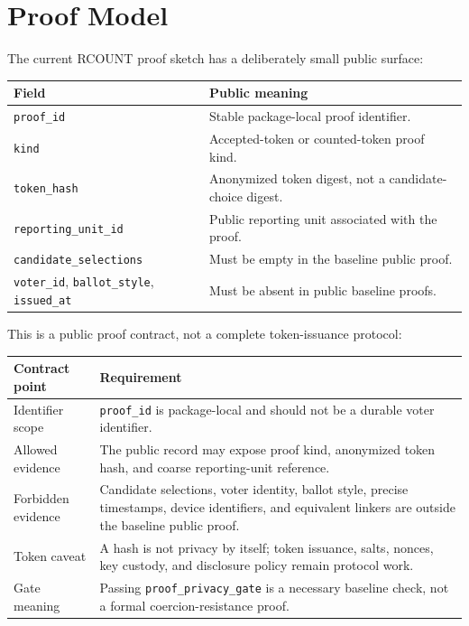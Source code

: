 \section{Proof Model}

The current RCOUNT proof sketch has a deliberately small public surface:

\begin{center}
\small
\begin{tabularx}{\textwidth}{lX}
\toprule
Field & Public meaning \\
\midrule
\texttt{proof\_id} & Stable package-local proof identifier. \\
\texttt{kind} & Accepted-token or counted-token proof kind. \\
\texttt{token\_hash} & Anonymized token digest, not a candidate-choice digest. \\
\texttt{reporting\_unit\_id} & Public reporting unit associated with the proof. \\
\texttt{candidate\_selections} & Must be empty in the baseline public proof. \\
\texttt{voter\_id}, \texttt{ballot\_style}, \texttt{issued\_at} & Must be absent in public baseline proofs. \\
\bottomrule
\end{tabularx}
\end{center}

This is a public proof contract, not a complete token-issuance protocol:

\begin{center}
\small
\begin{tabularx}{\textwidth}{lX}
\toprule
Contract point & Requirement \\
\midrule
Identifier scope & \texttt{proof\_id} is package-local and should not be a durable voter identifier. \\
Allowed evidence & The public record may expose proof kind, anonymized token hash, and coarse reporting-unit reference. \\
Forbidden evidence & Candidate selections, voter identity, ballot style, precise timestamps, device identifiers, and equivalent linkers are outside the baseline public proof. \\
Token caveat & A hash is not privacy by itself; token issuance, salts, nonces, key custody, and disclosure policy remain protocol work. \\
Gate meaning & Passing \texttt{proof\_privacy\_gate} is a necessary baseline check, not a formal coercion-resistance proof. \\
\bottomrule
\end{tabularx}
\end{center}

